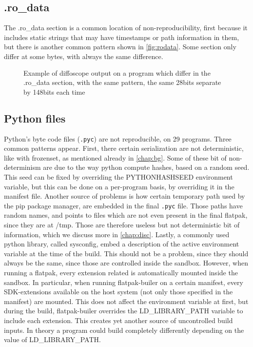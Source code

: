\documentclass[a4paper,11pt,oneside]{report}
\theoremstyle{definition}
\newcommand{\fp}{flatpak\xspace}
\newcommand{\fb}{flatpak-builer\xspace}
\newcommand{\ldlp}{LD\_LIBRARY\_PATH\xspace}
\newcommand{\dfc}{diffoscope\xspace}
\begin{document}
\subsection*{.ro\_data}
The .ro\_data section is a common location of non-reproducibility, first
because it includes static strings that may have timestamps or path information
in them, but there is another common pattern shown in \autoref{fig:rodata}.
Some section only differ at some bytes, with always the same difference.
\begin{figure}[h]
    \caption{Example of \dfc output on a program which differ in the .ro\_data section, with the same pattern, the same 28bits separate by 148bits each time}
    \label{fig:rodata}
\end{figure}

\subsection*{Python files}
Python's byte code files (\verb|.pyc|) are not reproducible, on 29 programs.
Three common patterns appear. First, there certain serialization are not
deterministic, like with frozenset, as mentioned already in \autoref{chap:bg}.
Some of these bit of non-determinism are due to the way python compute hashes,
based on a random seed. This seed can be fixed by overriding the PYTHONHASHSEED
environment variable, but this can be done on a per-program basis, by
overriding it in the manifest file. Another source of problems is how certain
temporary path used by the pip package manager, are embedded in the final
\verb|.pyc| file. Those paths have random names, and points to files which are
not even present in the final \fp, since they are at /tmp. Those are therefore
useless but not deterministic bit of information, which we discuss more in
\autoref{chap:disc}.
Lastly, a commonly used python library, called sysconfig, embed a description
of the active environment variable at the time of the build. This should not be
a problem, since they should always be the same, since those are controlled
inside the sandbox. However, when running a \fp, every extension related is
automatically mounted inside the sandbox. In particular, when running \fb on a
certain manifest, every SDK-extensions available on the host system (not only
those specified in the manifest) are mounted. This does not affect the
environment variable at first, but during the build, \fb overrides the
\ldlp variable to include each extension. This creates yet another
source of uncontrolled build inputs. In theory a program could build completely
differently depending on the value of \ldlp.
\end{document}
